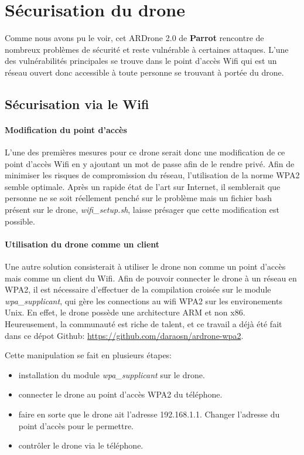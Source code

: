 \section{Sécurisation du drone}
Comme nous avons pu le voir, cet ARDrone 2.0 de \textbf{Parrot} rencontre de nombreux problèmes de sécurité et reste vulnérable à certaines attaques. L'une des vulnérabilités principales se trouve dans le point d'accès Wifi qui est un réseau ouvert donc accessible à toute personne se trouvant à portée du drone.

\subsection{Sécurisation via le Wifi}
\paragraph{Modification du point d'accès}
L'une des premières mesures pour ce drone serait donc une modification de ce point d'accès Wifi en y ajoutant un mot de passe afin de le rendre privé. Afin de minimiser les risques de compromission du réseau, l'utilisation de la norme WPA2 semble optimale. Après un rapide état de l'art sur Internet, il semblerait que personne ne se soit réellement penché sur le problème mais un fichier bash présent sur le drone, \textit{wifi_setup.sh}, laisse présager que cette modification est possible.

\paragraph{Utilisation du drone comme un client}
Une autre solution consisterait à utiliser le drone non comme un point d'accès mais comme un client du Wifi.
Afin de pouvoir connecter le drone à un réseau en WPA2, il est nécessaire d'effectuer de la compilation croisée sur le module \textit{wpa\_supplicant}, qui gère les connections au wifi WPA2 sur les environements Unix. En effet, le drone possède une architecture ARM et non x86. Heureusement, la communauté est riche de talent, et ce travail a déjà été fait dans ce dépot Github: \url{https://github.com/daraosn/ardrone-wpa2}.

Cette manipulation se fait en plusieurs étapes:
\begin{itemize}
  \item installation du module \textit{wpa\_supplicant} sur le drone.
  \item connecter le drone au point d'accès WPA2 du téléphone.
  \item faire en sorte que le drone ait l'adresse 192.168.1.1. Changer l'adresse du point d'accès pour le permettre.
  \item contrôler le drone via le téléphone.
\end{itemize}

